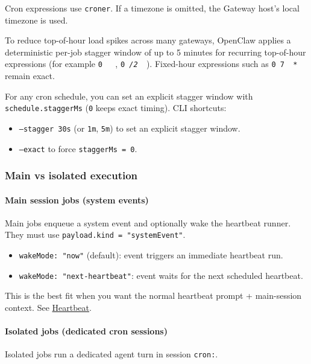 Cron expressions use \texttt{croner}. If a timezone is omitted, the Gateway host’s
local timezone is used.

To reduce top-of-hour load spikes across many gateways, OpenClaw applies a
deterministic per-job stagger window of up to 5 minutes for recurring
top-of-hour expressions (for example \texttt{0 \textit{ } \textit{ }}, \texttt{0 \textit{/2 } \textit{ }}). Fixed-hour
expressions such as \texttt{0 7 \textit{ } *} remain exact.

For any cron schedule, you can set an explicit stagger window with \texttt{schedule.staggerMs}
(\texttt{0} keeps exact timing). CLI shortcuts:

\begin{itemize}
  \item \texttt{--stagger 30s} (or \texttt{1m}, \texttt{5m}) to set an explicit stagger window.
  \item \texttt{--exact} to force \texttt{staggerMs = 0}.
\end{itemize}


\subsubsection{Main vs isolated execution}


\paragraph{Main session jobs (system events)}


Main jobs enqueue a system event and optionally wake the heartbeat runner.
They must use \texttt{payload.kind = "systemEvent"}.

\begin{itemize}
  \item \texttt{wakeMode: "now"} (default): event triggers an immediate heartbeat run.
  \item \texttt{wakeMode: "next-heartbeat"}: event waits for the next scheduled heartbeat.
\end{itemize}


This is the best fit when you want the normal heartbeat prompt + main-session context.
See \href{/gateway/heartbeat}{Heartbeat}.

\paragraph{Isolated jobs (dedicated cron sessions)}


Isolated jobs run a dedicated agent turn in session \texttt{cron:}.

